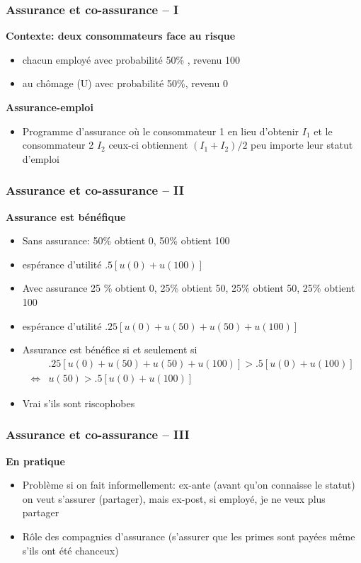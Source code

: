 \documentclass[handout]{beamer}
\newenvironment{iPar}[1]{\textbf{#1} \begin{itemize}}{\end{itemize}}
\newcommand{\mdp}{\medskip \pause}
\begin{document}
\begin{frame}\frametitle{Assurance et co-assurance -- I}
\begin{iPar}{Contexte: deux consommateurs face au risque}  \item chacun employé avec probabilité 50\% , revenu 100 \item au chômage (U) avec probabilité 50\%, revenu
0\end{iPar}\mdp

\begin{iPar}{Assurance-emploi} \item Programme d'assurance où
le consommateur 1 en lieu d'obtenir $I_1$ et le consommateur 2 $I_2$ ceux-ci obtiennent $(I_1+I_2)/2$ peu importe leur statut d'emploi \end{iPar}

\end{frame}

\begin{frame} \frametitle{Assurance et co-assurance -- II}

\begin{iPar}{Assurance est bénéfique} \item Sans assurance: 50\%
obtient 0, 50\% obtient 100 \item espérance d'utilité $ .5 [u(0) + u(100)] $ \item
Avec assurance 25 \% obtient 0, 25\% obtient 50, 25\% obtient 50, 25\% obtient
100 \item espérance d'utilité $.25[u(0) + u(50) + u(50) + u(100)]$ \item
Assurance est bénéfice si et seulement si \begin{eqnarray*} & .25[u(0) + u(50) +
u(50) + u(100)] > .5 [u(0) + u(100)]\\ \iff& u(50) > .5[u(0)+u(100)]
\end{eqnarray*}\item Vrai s'ils sont riscophobes  \end{iPar}

\end{frame}

\begin{frame} \frametitle{Assurance et co-assurance -- III}
\begin{iPar}{En pratique} \item Problème si on fait informellement:
ex-ante (avant qu'on connaisse le statut) on veut s'assurer (partager), mais ex-post, si employé, je ne veux plus partager \item Rôle des compagnies d'assurance
(s'assurer que les primes sont payées même s'ils ont été chanceux)\end{iPar}

\end{frame}
\end{document}
